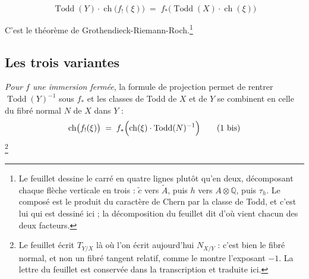 \documentclass[11pt,a4paper]{article}
\begin{document}
\begin{equation*}
  \operatorname{Todd}(Y) \cdot \operatorname{ch}\bigl(f_{!}(\xi)\bigr)
  \;=\; f_{*}\bigl(\operatorname{Todd}(X) \cdot \operatorname{ch}(\xi)\bigr)
  \tag{1}
\end{equation*}

C'est le théorème de Grothendieck-Riemann-Roch.\footnote{Le feuillet dessine le
carré en quatre lignes plutôt qu'en deux, décomposant chaque flèche verticale
en trois : $\widetilde{c}$ vers $\widetilde{A}$, puis $h$ vers $A \otimes
\mathbb{Q}$, puis $\tau_{h}$. Le composé est le produit du caractère de Chern
par la classe de Todd, et c'est lui qui est dessiné ici ; la décomposition du
feuillet dit d'où vient chacun des deux facteurs.}

\subsection*{Les trois variantes}

\emph{Pour $f$ une immersion fermée}, la formule de projection permet de
rentrer $\operatorname{Todd}(Y)^{-1}$ sous $f_{*}$ et les classes de Todd de
$X$ et de $Y$ se combinent en celle du fibré normal $N$ de $X$ dans $Y$ :
\begin{equation*}
  \operatorname{ch}\bigl(f_{!}(\xi)\bigr)
  \;=\; f_{*}\Bigl(\operatorname{ch}(\xi)\cdot \operatorname{Todd}(N)^{-1}\Bigr)
  \tag{1 bis}
\end{equation*}
\footnote{Le feuillet écrit $T_{Y/X}$ là où l'on écrit aujourd'hui $N_{X/Y}$ :
c'est bien le fibré normal, et non un fibré tangent relatif, comme le montre
l'exposant $-1$. La lettre du feuillet est conservée dans la transcription et
traduite ici.}
\end{document}
